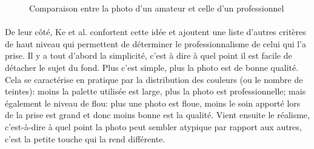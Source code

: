 \documentclass[11pt, french]{report-rd-info}
\begin{document}
\begin{figure}[htp]
 \caption{Comparaison entre la photo d'un amateur et celle d'un professionnel \cite{Ke}}
 \label{fig:ComparaisonPhotosAmateurPro}
\end{figure}
\paragraph*{}
\label{crit:both}
De leur côté, Ke et al. \cite{Ke} confortent cette idée et ajoutent une liste d’autres critères de haut niveau qui permettent de déterminer le professionnalisme de celui qui l’a prise. Il y a tout d’abord la simplicité, c'est à dire à quel point il est facile de détacher le sujet du fond. Plus c'est simple, plus la photo est de bonne qualité. Cela se caractérise en pratique par la distribution des couleurs (ou le nombre de teintes): moins la palette utilisée est large, plus la photo est professionnelle; mais également le niveau de flou: plus une photo est floue, moins le soin apporté lors de la prise est grand et donc moins bonne est la qualité.
Vient ensuite le réalisme, c'est-à-dire à quel point la photo peut sembler atypique par rapport aux autres, c'est la petite touche qui la rend différente.
\end{document}
